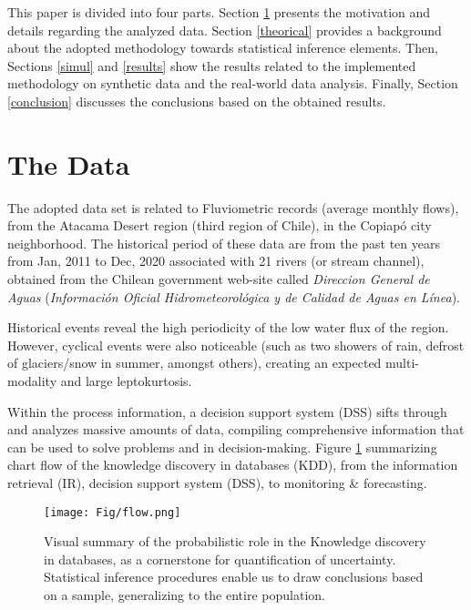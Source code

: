 \documentclass[]{interact}
\theoremstyle{plain}%
\theoremstyle{definition}
\theoremstyle{remark}
\begin{document}
This paper is divided into four parts. Section \ref{data} presents the motivation and details regarding the analyzed data. Section \ref{theorical} provides a background about the adopted methodology towards statistical inference elements. Then, Sections \ref{simul} and \ref{results} show the results related to the implemented methodology on synthetic data and the real-world data analysis. Finally, Section \ref{conclusion} discusses the conclusions based on the obtained results.


\section{The Data}\label{data}

The adopted data set is related to Fluviometric records (average monthly flows), from the Atacama Desert region (third region of Chile), in the Copiapó city neighborhood. The historical period of these data are from the past ten years from Jan, 2011 to Dec, 2020 associated with 21 rivers (or stream channel), obtained from the Chilean government web-site called \textit{Direccion General de Aguas} (\textit{Información Oficial Hidrometeorológica y de Calidad de Aguas en Línea}).

Historical events reveal the high periodicity of the low water flux of the region. However, cyclical events were also noticeable (such as two showers of rain, defrost of glaciers/snow in summer, amongst others), creating an expected multi-modality and large leptokurtosis.


Within the process information, a decision support system (DSS) sifts through and analyzes massive amounts of data, compiling comprehensive information that can be used to solve problems and in decision-making. Figure \ref{fig:DSS} summarizing chart flow of the knowledge discovery in databases (KDD), from the information retrieval (IR), decision support system (DSS), to monitoring \& forecasting.
\begin{figure}
    \centering
    \texttt{[image: Fig/flow.png]}
    \caption{Visual summary of the probabilistic role in the Knowledge discovery in databases, as a cornerstone for quantification of uncertainty. Statistical inference procedures enable us to draw conclusions based on a sample, generalizing to the entire population.}
    \label{fig:DSS}
\end{figure}
\end{document}
